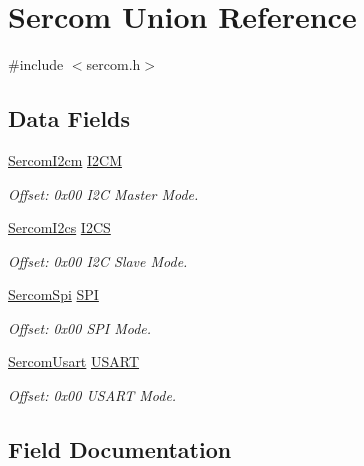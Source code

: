 \hypertarget{union_sercom}{}\section{Sercom Union Reference}
\label{union_sercom}


{\ttfamily \#include $<$sercom.\+h$>$}

\subsection*{Data Fields}
\begin{DoxyCompactItemize}
\item 
\mbox{\hyperlink{struct_sercom_i2cm}{Sercom\+I2cm}} \mbox{\hyperlink{union_sercom_acb0fe0b520f29e46bc2b33f8224ff1b0}{I2\+CM}}
\begin{DoxyCompactList}\small\item\em Offset\+: 0x00 I2C Master Mode. \end{DoxyCompactList}\item 
\mbox{\hyperlink{struct_sercom_i2cs}{Sercom\+I2cs}} \mbox{\hyperlink{union_sercom_ab1a9da984385009f7088a4de3d6a94f2}{I2\+CS}}
\begin{DoxyCompactList}\small\item\em Offset\+: 0x00 I2C Slave Mode. \end{DoxyCompactList}\item 
\mbox{\hyperlink{struct_sercom_spi}{Sercom\+Spi}} \mbox{\hyperlink{union_sercom_a3c7d514eed30a40532e99e043221ccf3}{S\+PI}}
\begin{DoxyCompactList}\small\item\em Offset\+: 0x00 S\+PI Mode. \end{DoxyCompactList}\item 
\mbox{\hyperlink{struct_sercom_usart}{Sercom\+Usart}} \mbox{\hyperlink{union_sercom_ad768b8d41f965d5af28dfaa85048677b}{U\+S\+A\+RT}}
\begin{DoxyCompactList}\small\item\em Offset\+: 0x00 U\+S\+A\+RT Mode. \end{DoxyCompactList}\end{DoxyCompactItemize}


\subsection{Field Documentation}
\mbox{\label{union_sercom_acb0fe0b520f29e46bc2b33f8224ff1b0}} 
